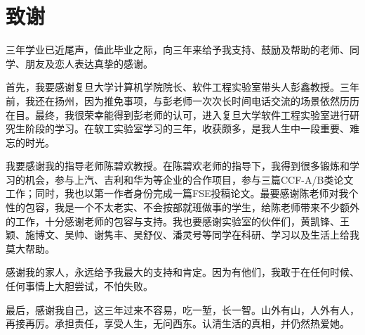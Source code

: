 \chapter{致谢}

三年学业已近尾声，值此毕业之际，向三年来给予我支持、鼓励及帮助的老师、同学、朋友及恋人表达真挚的感谢。

首先，我要感谢复旦大学计算机学院院长、软件工程实验室带头人彭鑫教授。三年前，我还在扬州，因为推免事项，与彭老师一次次长时间电话交流的场景依然历历在目。最终，我很荣幸能得到彭老师的认可，进入复旦大学软件工程实验室进行研究生阶段的学习。在软工实验室学习的三年，收获颇多，是我人生中一段重要、难忘的时光。

我要感谢我的指导老师陈碧欢教授。在陈碧欢老师的指导下，我得到很多锻炼和学习的机会，参与上汽、吉利和华为等企业的合作项目，参与三篇CCF-A/B类论文工作；同时，我也以第一作者身份完成一篇FSE投稿论文。最要感谢陈老师对我个性的包容，我是一个不太老实、不会按部就班做事的学生，给陈老师带来不少额外的工作，十分感谢老师的包容与支持。我也要感谢实验室的伙伴们，黄凯锋、王颖、施博文、吴帅、谢隽丰、吴舒仪、潘灵号等同学在科研、学习以及生活上给我莫大帮助。

感谢我的家人，永远给予我最大的支持和肯定。因为有他们，我敢于在任何时候、任何事情上大胆尝试，不怕失败。

最后，感谢我自己，这三年过来不容易，吃一堑，长一智。山外有山，人外有人，再接再厉。承担责任，享受人生，无问西东。认清生活的真相，并仍然热爱她。
